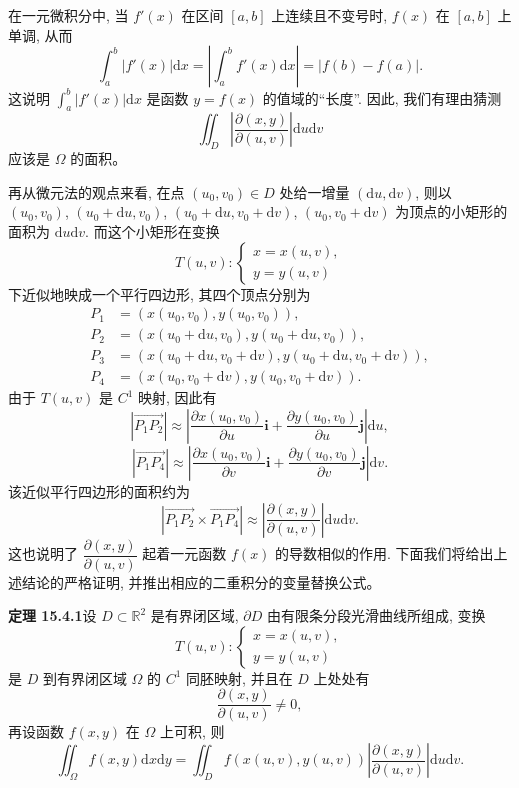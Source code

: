 \documentclass[UTF8,12pt,a4paper,fontset=fandol]{ctexart}
\begin{document}
在一元微积分中, 当 $f'(x)$ 在区间 $[a,b]$ 上连续且不变号时, $f(x)$ 在 $[a,b]$ 上单调, 从而
\[
  \int_a^b|f'(x)|\mathrm dx
  =\left|\int_a^bf'(x)\mathrm dx\right|
  =|f(b)-f(a)|.
\]
这说明 $\int_a^b|f'(x)|\mathrm dx$ 是函数 $y=f(x)$ 的值域的“长度”. 因此, 我们有理由猜测
\[
  \iint_D\left|\frac{\partial(x,y)}{\partial(u,v)}\right|\mathrm du\mathrm dv
\]
应该是 $\Omega$ 的面积。

再从微元法的观点来看, 在点 $(u_0,v_0)\in D$ 处给一增量 $(\mathrm du,\mathrm dv)$, 则以 $(u_0,v_0)$, $(u_0+\mathrm du,v_0)$, $(u_0+\mathrm du,v_0+\mathrm dv)$, $(u_0,v_0+\mathrm dv)$ 为顶点的小矩形的面积为 $\mathrm du\mathrm dv$. 而这个小矩形在变换
\[
  T(u,v):
  \begin{cases}
    x=x(u,v),\\
    y=y(u,v)
  \end{cases}
\]
下近似地映成一个平行四边形, 其四个顶点分别为
\[
\begin{aligned}
  P_1&=(x(u_0,v_0),y(u_0,v_0)),\\
  P_2&=(x(u_0+\mathrm du,v_0),y(u_0+\mathrm du,v_0)),\\
  P_3&=(x(u_0+\mathrm du,v_0+\mathrm dv),y(u_0+\mathrm du,v_0+\mathrm dv)),\\
  P_4&=(x(u_0,v_0+\mathrm dv),y(u_0,v_0+\mathrm dv)).
\end{aligned}
\]
由于 $T(u,v)$ 是 $C^1$ 映射, 因此有
\[
  |\overrightarrow{P_1P_2}|\approx
  \left|\frac{\partial x(u_0,v_0)}{\partial u}\boldsymbol i
  +\frac{\partial y(u_0,v_0)}{\partial u}\boldsymbol j\right|\mathrm du,
\]
\[
  |\overrightarrow{P_1P_4}|\approx
  \left|\frac{\partial x(u_0,v_0)}{\partial v}\boldsymbol i
  +\frac{\partial y(u_0,v_0)}{\partial v}\boldsymbol j\right|\mathrm dv.
\]
该近似平行四边形的面积约为
\[
  |\overrightarrow{P_1P_2}\times\overrightarrow{P_1P_4}|
  \approx
  \left|\frac{\partial(x,y)}{\partial(u,v)}\right|\mathrm du\mathrm dv.
\]
这也说明了 $\dfrac{\partial(x,y)}{\partial(u,v)}$ 起着一元函数 $f(x)$ 的导数相似的作用. 下面我们将给出上述结论的严格证明, 并推出相应的二重积分的变量替换公式。

\noindent\textbf{定理 15.4.1}\quad 设 $D\subset\mathbb R^2$ 是有界闭区域, $\partial D$ 由有限条分段光滑曲线所组成, 变换
\[
  T(u,v):
  \begin{cases}
    x=x(u,v),\\
    y=y(u,v)
  \end{cases}
\]
是 $D$ 到有界闭区域 $\Omega$ 的 $C^1$ 同胚映射, 并且在 $D$ 上处处有
\[
  \frac{\partial(x,y)}{\partial(u,v)}\ne0,
\]
再设函数 $f(x,y)$ 在 $\Omega$ 上可积, 则
\[
  \iint_\Omega f(x,y)\mathrm dx\mathrm dy
  =\iint_D f(x(u,v),y(u,v))
  \left|\frac{\partial(x,y)}{\partial(u,v)}\right|\mathrm du\mathrm dv.
\]
\end{document}
